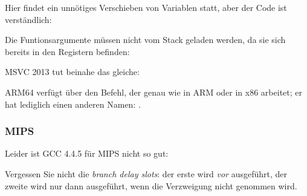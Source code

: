 
Hier findet ein unnötiges Verschieben von Variablen statt, aber der Code ist verständlich:



Die Funtionsargumente müssen nicht vom Stack geladen werden, da sie sich bereits in den Registern befinden:



MSVC 2013 tut beinahe das gleiche:


ARM64 verfügt über den  Befehl, der genau wie  in ARM oder  in x86 arbeitet; er hat
lediglich einen anderen Namen:
.



\subsubsection{MIPS}

Leider ist GCC 4.4.5 für MIPS nicht so gut:

 
Vergessen Sie nicht die \emph{branch delay slots}: der erste  wird \emph{vor}  ausgeführt, der zweite
 wird nur dann ausgeführt, wenn die Verzweigung nicht genommen wird.


